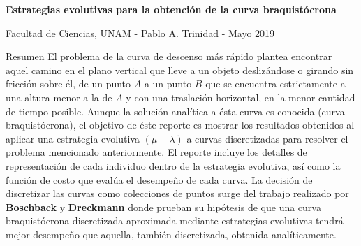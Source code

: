 \documentclass[10pt, letterpaper]{article}
\theoremstyle{definition}
\begin{document}
\begin{center}
    {\large \bfseries Estrategias evolutivas para 
    la obtención de la curva braquistócrona \par}
    \vspace{0.2cm}
    Facultad de Ciencias, UNAM - Pablo A. Trinidad - Mayo 2019
\end{center}

\begin{section}{Resumen}
    El problema de la curva de descenso más rápido plantea encontrar aquel
    camino en el plano vertical que lleve a un objeto deslizándose o girando
    sin fricción sobre él, de un punto $A$ a un punto $B$ que se encuentra
    estrictamente a una altura menor a la de $A$ y con una traslación horizontal,
    en la menor cantidad de tiempo posible. Aunque la solución analítica a ésta
    curva es conocida (curva braquistócrona), el objetivo de éste reporte es
    mostrar los resultados obtenidos al aplicar una estrategia evolutiva
    $(\mu + \lambda)$ a curvas discretizadas para resolver el problema
    mencionado anteriormente. El reporte incluye los detalles de representación
    de cada individuo dentro de la estrategia evolutiva, así como la función
    de costo que evalúa el desempeño de cada curva. La decisión de discretizar
    las curvas como colecciones de puntos surge del trabajo realizado por
    \textbf{Boschback} y \textbf{Dreckmann}\cite{es-brachistochrone} donde
    prueban su hipótesis de que una curva braquistócrona discretizada aproximada
    mediante estrategias evolutivas tendrá mejor desempeño que aquella, también
    discretizada, obtenida analíticamente.
\end{section}
\end{document}
